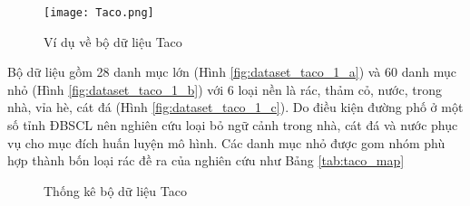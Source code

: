 \documentclass[../the.tex]{subfiles}
\begin{document}
\begin{figure}[H]
	\centering
	\texttt{[image: Taco.png]}
	\caption{Ví dụ về bộ dữ liệu Taco \cite{proença2020taco}}
	\label{fig:dataset_taco}
\end{figure}
{\fontsize{13}{12} \selectfont

Bộ dữ liệu gồm 28 danh mục lớn  (Hình \ref{fig:dataset_taco_1_a}) và 60 danh mục nhỏ (Hình \ref{fig:dataset_taco_1_b}) với
6 loại nền là rác, thảm cỏ, nước, trong nhà, vỉa hè, cát đá (Hình \ref{fig:dataset_taco_1_c}). Do
điều kiện đường phố ở một số tỉnh ĐBSCL nên nghiên cứu loại bỏ ngữ cảnh trong nhà, cát đá và nước phục vụ cho mục đích huấn luyện mô hình. Các danh
mục nhỏ được gom nhóm phù hợp thành bốn loại rác đề ra của nghiên cứu như Bảng \ref{tab:taco_map}
}

\begin{figure}[H]
	\centering
	\qquad
	\qquad
	\caption{Thống kê bộ dữ liệu Taco}%
	\label{fig:dataset_taco_1}
\end{figure}
\end{document}
